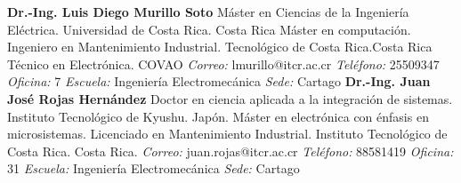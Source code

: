 \documentclass[letterpaper]{article}%
\newenvironment{textoMargen}
    {%
    \begin{list}{}{%
        \setlength{\leftmargin}{3.6cm}%
        \setlength{\rightmargin}{1.1cm}%
    }%
    \item[]%
  }
  {%
    \end{list}%
  }
\begin{document}
\vspace*{-4mm}\begin{textoMargen}\textbf{Dr.{-}Ing. Luis Diego Murillo Soto} \newline Máster en Ciencias de la Ingeniería Eléctrica. Universidad de Costa Rica. Costa Rica \newline \newline  Máster en computación. Ingeniero en Mantenimiento Industrial. Tecnológico de Costa Rica.Costa Rica \newline \newline  Técnico en Electrónica. COVAO \newline \newline \emph{Correo:} lmurillo@itcr.ac.cr\emph{  Teléfono:} 25509347 \vspace*{1mm} \newline \emph{  Oficina:} 7\emph{  Escuela:} Ingeniería Electromecánica\emph{  Sede:} Cartago \vspace*{4mm} \newline \textbf{Dr.{-}Ing. Juan José Rojas Hernández} \newline Doctor en ciencia aplicada a la integración de sistemas. Instituto Tecnológico de Kyushu. Japón. \newline \newline  Máster en electrónica con énfasis en microsistemas. Licenciado en Mantenimiento Industrial. Instituto Tecnológico de Costa Rica. Costa Rica. \newline \newline \emph{Correo:} juan.rojas@itcr.ac.cr\emph{  Teléfono:} 88581419 \vspace*{1mm} \newline \emph{  Oficina:} 31\emph{  Escuela:} Ingeniería Electromecánica\emph{  Sede:} Cartago \vspace*{4mm} \newline \end{textoMargen}%
\end{document}
